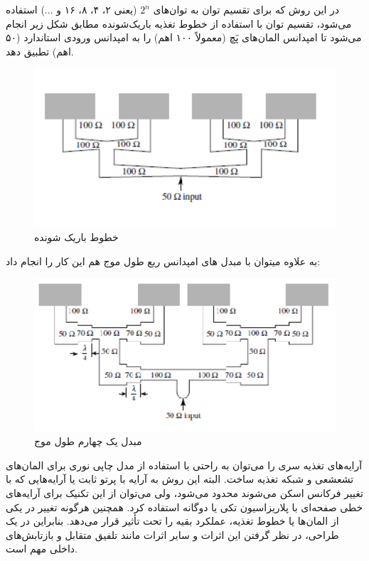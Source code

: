 در این روش که برای تقسیم توان به توان‌های
$ 2^n$
 (یعنی ۲، ۴، ۸، ۱۶ و ...) استفاده می‌شود، تقسیم توان با استفاده از خطوط تغذیه باریک‌شونده
 مطابق شکل زیر انجام می‌شود تا امپدانس المان‌های پَچ (معمولاً ۱۰۰ اهم) را به امپدانس ورودی استاندارد (۵۰ اهم) تطبیق دهد.



\begin{figure}
	\centering
	\includegraphics[scale=0.3]{Images/fig15.png}
	\caption{خطوط باریک شونده}
	\label{fig15}
\end{figure}

به علاوه میتوان با مبدل های امپدانس ربع طول موج هم این کار را انجام داد:
\begin{figure}
	\centering
	\includegraphics[scale=0.4]{Images/fig16.png}
	\caption{مبدل یک چهارم طول موج}
	\label{fig16}
\end{figure}

آرایه‌های تغذیه سری را می‌توان به راحتی با استفاده از مدل چاپی نوری برای المان‌های تشعشعی و شبکه تغذیه ساخت. البته این روش به آرایه با پرتو ثابت یا آرایه‌هایی که با تغییر فرکانس اسکن می‌شوند محدود می‌شود، ولی می‌توان از این تکنیک برای آرایه‌های خطی صفحه‌ای با پلاریزاسیون تکی یا دوگانه استفاده کرد. همچنین هرگونه تغییر در یکی از المان‌ها یا خطوط تغذیه، عملکرد بقیه را تحت تأثیر قرار می‌دهد. بنابراین در یک طراحی، در نظر گرفتن این اثرات و سایر اثرات مانند تلفیق متقابل و بازتابش‌های داخلی مهم است.



